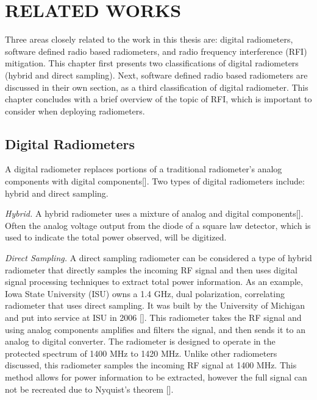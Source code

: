 

\chapter{RELATED WORKS}\label{ch:relatedworks}

Three areas closely related to the work in this thesis are: digital radiometers, software defined radio based radiometers, and radio frequency interference (RFI) mitigation.  This chapter first presents two classifications of digital radiometers (hybrid and direct sampling).  Next, software defined radio based radiometers are discussed in their own section, as a third classification of digital radiometer.  This chapter concludes with a brief overview of the topic of RFI, which is important to consider when deploying radiometers.

\section{Digital Radiometers}

A digital radiometer replaces portions of a traditional radiometer's analog components with digital components[\cite{Ruf}].  Two types of digital radiometers include: hybrid and direct sampling.

\emph{Hybrid.}  A hybrid radiometer uses a mixture of  analog and digital components[\cite{skou}].  Often the analog voltage output from the diode of a square law detector, which is used to indicate the total power observed, will be digitized. 

\emph{Direct Sampling.}  A direct sampling radiometer can be considered a type of hybrid radiometer that directly samples the incoming RF signal and then uses digital signal processing techniques to extract total power information.  As an example, Iowa State University (ISU) owns a 1.4 GHz, dual polarization, correlating radiometer that uses direct sampling.  It was built by the University of Michigan and put into service at ISU in 2006 [\cite{Erbas}].  This radiometer takes the RF signal and using analog components amplifies and filters the signal, and then sends it to an analog to digital converter.  The radiometer is designed to operate in the protected spectrum of 1400 MHz to 1420 MHz.  Unlike other radiometers discussed, this radiometer samples the incoming RF signal at 1400 MHz.  This method allows for power information to be extracted, however the full signal can not be recreated due to Nyquist's theorem [\cite{Fischman2001}].

